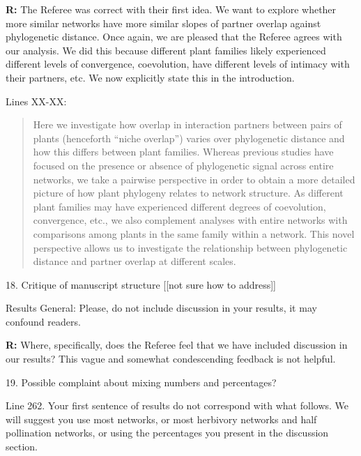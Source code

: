 \documentclass[12pt]{letter}
\newenvironment{refquote}{\bigskip \begin{it}}{\end{it}\smallskip}
\begin{document}
		\textbf{R:} The Referee was correct with their first idea. We want to explore whether more similar networks have more similar slopes of partner overlap against phylogenetic distance. Once again, we are pleased that the Referee agrees with our analysis. We did this because different plant families likely experienced different levels of convergence, coevolution, have different levels of intimacy with their partners, etc. We now explicitly state this in the introduction.


		Lines XX-XX:

		\begin{quotation}

		  Here we investigate how overlap in interaction partners between 
		  pairs of plants (henceforth ``niche overlap'') varies over 
		  phylogenetic distance and how this differs between plant families. 
		  Whereas previous 
		  studies have focused on the presence or absence of phylogenetic
		  signal across entire networks, we take a pairwise perspective in
		  order to obtain a more detailed picture of how plant phylogeny
		  relates to network structure. As different plant families may have experienced different degrees of coevolution, convergence, etc., we also complement analyses with entire networks with comparisons among plants in the same family within a network. 
		  This novel perspective allows us to investigate the relationship between phylogenetic distance and partner overlap at different scales. 

  		\end{quotation}


	18. Critique of manuscript structure [[not sure  how to address]]

		\begin{refquote}
			Results
			General: Please, do not include discussion in your results, it may confound readers.
		\end{refquote}

		\textbf{R:} Where, specifically, does the Referee feel that we have included discussion in our results? This vague and somewhat condescending feedback is not helpful.


	19. Possible complaint about mixing numbers and percentages?

		\begin{refquote}
			Line 262. Your first sentence of results do not correspond with what follows. We will suggest you use most networks, or most herbivory networks and half pollination networks, or using the percentages you present in the discussion section.
		\end{refquote}
\end{document}
